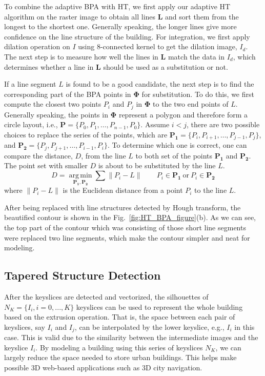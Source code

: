 \documentclass{acmsiggraph}                     %
\newcommand{\Figb}[1]{Fig.~\ref{fig:#1}(b)}
\begin{document}
To combine the adaptive BPA with HT, we first apply our adaptive HT algorithm on the raster
image to obtain all lines $\boldsymbol{L}$ and sort them from the longest to the shortest one.
Generally speaking, the longer lines give more confidence on the line structure of the building.
For integration, we first apply dilation operation on $I$ using 8-connected kernel
to get the dilation image, $I_d$. The next step is to measure how well the lines in
$\boldsymbol{L}$ match the data in $I_d$, which determines whether a line in $\boldsymbol{L}$
should be used as a substitution or not.

If a line segment $L$ is found to be a good candidate, the next step is to find the corresponding part of the
BPA points in $\boldsymbol{\Phi}$ for substitution. To do this, we first compute the closest two points
$P_i$ and $P_j$ in $\boldsymbol{\Phi}$ to the two end points of $L$.
Generally speaking, the points in $\boldsymbol{\Phi}$ represent a polygon and therefore form a circle layout, i.e.,
$\boldsymbol{P} = \{ P_0,P_1,\ldots ,P_{n-1}, P_0 \}$. Assume $i < j$, there are two possible choices to replace
the series of the points, which are
$\boldsymbol{P_1} = \{ P_i,P_{i+1},\ldots,P_{j-1}, P_j \}$, and
$\boldsymbol{P_2} = \{ P_j,P_{j+1},\ldots,P_{i-1}, P_i \}$.
To determine which one is correct, one can compare the distance, $D$, from the line $L$ to both
set of the points $\boldsymbol{P_1}$ and $\boldsymbol{P_2}$. The point set with smaller $D$ is
about to be substituted by the line $L$.
\begin{equation*}
D = \underset{\boldsymbol{P_1},\boldsymbol{P_2}}{\operatorname{arg\,min}}\sum{\lVert P_i - L \rVert}
\qquad P_i \in \boldsymbol{P_1} \ \text{or} \ P_i \in \boldsymbol{P_2}
\end{equation*}
where $\lVert P_i - L \rVert$ is the Euclidean distance from a point $P_i$ to the line $L$.

After being replaced with line structures detected by Hough transform, the beautified contour is
shown in the \Figb{HT_BPA_figure}. As we can see, the top part of the contour which was consisting
of those short line segments were replaced two line segments, which make the contour simpler and neat
for modeling.

\subsection{Tapered Structure Detection}
\label{sec:tsd}
After the keyslices are detected and vectorized, the silhouettes of
$N_K = \{I_{i}, i = 0, ..., K \}$ keyslices
can be used to represent the whole building based on the extrusion operation.
That is, the space between each pair of keyslices, say $I_{i}$ and $I_{j}$,
can be interpolated by the lower keyslice, e.g., $I_{i}$ in this case.
This is valid due to the similarity between the intermediate images and the
keyslice $I_{i}$.
By modeling a building using this series of keyslices $N_K$, we can largely
reduce the space needed to store urban buildings.
This helps make possible 3D web-based applications such as 3D city navigation.
\end{document}
